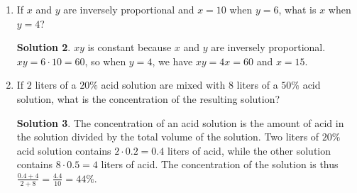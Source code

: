 \documentclass{article}
\theoremstyle{definition}
\newtheorem*{solution}{Solution}
\begin{document}
\begin{enumerate}
\begin{solution}
        \end{solution}
        \item If $x$ and $y$ are inversely proportional and $x = 10$ when $y = 6$, what is $x$ when $y = 4$?
        \begin{solution}
            $xy$ is constant because $x$ and $y$ are inversely proportional. $xy = 6 \cdot 10 = 60$, so when $y = 4$, we have $xy = 4x = 60$ and $x = 15$.
        \end{solution}
        \item If $2$ liters of a $20\%$ acid solution are mixed with $8$ liters of a $50\%$ acid solution, what is the concentration of the resulting solution?
        \begin{solution}
            The concentration of an acid solution is the amount of acid in the solution divided by the total volume of the solution. Two liters of $20\%$ acid solution contains $2 \cdot 0.2 = 0.4$ liters of acid, while the other solution contains $8 \cdot 0.5 = 4$ liters of acid. The concentration of the solution is thus $\frac{0.4 + 4}{2 + 8} = \frac{4.4}{10} = 44\%$.
        \end{solution}
    \end{enumerate}
\end{document}
